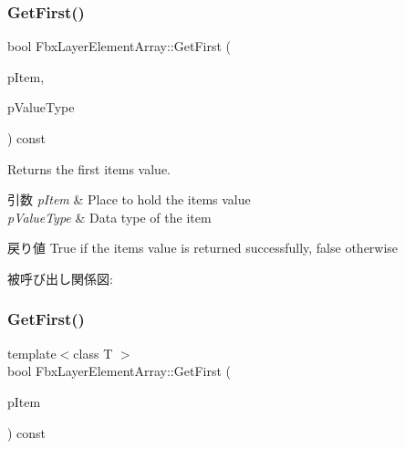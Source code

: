 \mbox{\label{class_fbx_layer_element_array_ad54e636bdab3dfb407cb0561ae6460e0}} 
\subsubsection{\texorpdfstring{Get\+First()}{GetFirst()}\hspace{0.1cm}{\footnotesize\ttfamily [1/2]}}
{\footnotesize\ttfamily bool Fbx\+Layer\+Element\+Array\+::\+Get\+First (\begin{DoxyParamCaption}\item[{void $\ast$$\ast$}]{p\+Item,  }\item[{\hyperlink{fbxpropertytypes_8h_a73913a5ddfb20e57c6f25e9e6784bd92}{E\+Fbx\+Type}}]{p\+Value\+Type }\end{DoxyParamCaption}) const}

Returns the first item\textquotesingle{}s value. 
\begin{DoxyParams}{引数}
{\em p\+Item} & Place to hold the item\textquotesingle{}s value \\
\hline
{\em p\+Value\+Type} & Data type of the item \\
\hline
\end{DoxyParams}
\begin{DoxyReturn}{戻り値}
{\ttfamily True} if the item\textquotesingle{}s value is returned successfully, {\ttfamily false} otherwise 
\end{DoxyReturn}
被呼び出し関係図\+:
\mbox{\label{class_fbx_layer_element_array_ae6f77a98d976ed7afbb8c455f0d26437}} 
\subsubsection{\texorpdfstring{Get\+First()}{GetFirst()}\hspace{0.1cm}{\footnotesize\ttfamily [2/2]}}
{\footnotesize\ttfamily template$<$class T $>$ \\
bool Fbx\+Layer\+Element\+Array\+::\+Get\+First (\begin{DoxyParamCaption}\item[{T $\ast$}]{p\+Item }\end{DoxyParamCaption}) const}

